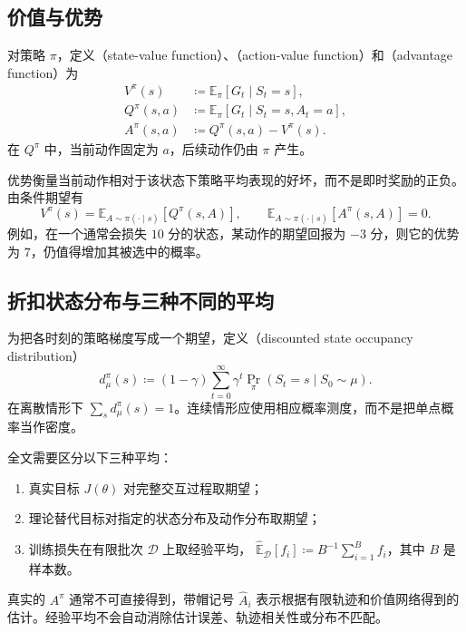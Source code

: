 \documentclass[UTF8]{ctexart}
\begin{document}
\subsection{价值与优势}

\begin{definition}[价值函数与优势函数]
对策略 $\pi$，定义（state-value function）、（action-value function）和（advantage function）为
\begin{align}
  V^\pi(s)&\coloneqq\mathbb E_\pi[G_t\mid S_t=s],\\
  Q^\pi(s,a)&\coloneqq\mathbb E_\pi[G_t\mid S_t=s,A_t=a],\\
  A^\pi(s,a)&\coloneqq Q^\pi(s,a)-V^\pi(s).
  \label{eq:ppo-advantage}
\end{align}
在 $Q^\pi$ 中，当前动作固定为 $a$，后续动作仍由 $\pi$ 产生。
\end{definition}

优势衡量当前动作相对于该状态下策略平均表现的好坏，而不是即时奖励的正负。由条件期望有
\begin{equation}
  V^\pi(s)=\mathbb E_{A\sim\pi(\cdot\mid s)}[Q^\pi(s,A)],
  \qquad
  \mathbb E_{A\sim\pi(\cdot\mid s)}[A^\pi(s,A)]=0.
  \label{eq:ppo-zero-mean-advantage}
\end{equation}
例如，在一个通常会损失 $10$ 分的状态，某动作的期望回报为 $-3$ 分，则它的优势为 $7$，仍值得增加其被选中的概率。

\subsection{折扣状态分布与三种不同的平均}

为把各时刻的策略梯度写成一个期望，定义（discounted state occupancy distribution）
\begin{equation}
  d^\pi_\mu(s)
  \coloneqq(1-\gamma)\sum_{t=0}^{\infty}
  \gamma^t\Pr_\pi(S_t=s\mid S_0\sim\mu).
  \label{eq:ppo-occupancy}
\end{equation}
在离散情形下 $\sum_s d^\pi_\mu(s)=1$。连续情形应使用相应概率测度，而不是把单点概率当作密度。

全文需要区分以下三种平均：
\begin{enumerate}
  \item 真实目标 $J(\theta)$ 对完整交互过程取期望；
  \item 理论替代目标对指定的状态分布及动作分布取期望；
  \item 训练损失在有限批次 $\mathcal D$ 上取经验平均，
  $\widehat{\mathbb E}_{\mathcal D}[f_i]\coloneqq B^{-1}\sum_{i=1}^B f_i$，其中 $B$ 是样本数。
\end{enumerate}
真实的 $A^\pi$ 通常不可直接得到，带帽记号 $\widehat A_i$ 表示根据有限轨迹和价值网络得到的估计。经验平均不会自动消除估计误差、轨迹相关性或分布不匹配。
\end{document}
